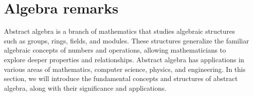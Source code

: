 \section{Algebra remarks}
Abstract algebra is a branch of mathematics that studies algebraic structures such as groups, 
rings, fields, and modules. These structures generalize the familiar algebraic concepts 
of numbers and operations, allowing mathematicians to explore deeper properties and 
relationships. Abstract algebra has applications in various areas of mathematics, 
computer science, physics, and engineering. In this section, we will introduce the 
fundamental concepts and structures of abstract algebra, along with their significance 
and applications.



